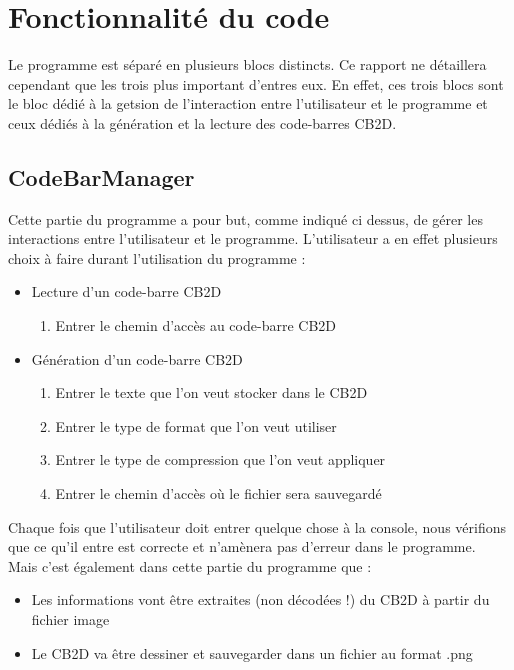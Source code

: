 \newpage

\section{Fonctionnalité du code}

Le programme est séparé en plusieurs blocs distincts. Ce rapport ne détaillera cependant que les trois plus important d'entres eux. En effet, ces trois blocs sont le bloc dédié à la getsion de l'interaction entre l'utilisateur et le programme et ceux dédiés à la génération et la lecture des code-barres CB2D.

\subsection{CodeBarManager}

Cette partie du programme a pour but, comme indiqué ci dessus, de gérer les interactions entre l'utilisateur et le programme. L'utilisateur a en effet plusieurs choix à faire durant l'utilisation du programme : 

\begin{itemize}
\item Lecture d'un code-barre CB2D
	\begin{enumerate}
	\item Entrer le chemin d'accès au code-barre CB2D
	\end{enumerate}
\item Génération d'un code-barre CB2D
	\begin{enumerate}
	\item Entrer le texte que l'on veut stocker dans le CB2D
	\item Entrer le type de format que l'on veut utiliser
	\item Entrer le type de compression que l'on veut appliquer
	\item Entrer le chemin d'accès où le fichier sera sauvegardé
	\end{enumerate}
\end{itemize}

Chaque fois que l'utilisateur doit entrer quelque chose à la console, nous vérifions que ce qu'il entre est correcte et n'amènera pas d'erreur dans le programme. 
\\
Mais c'est également dans cette partie du programme que : 
\begin{itemize}
\item Les informations vont être extraites (non décodées !) du CB2D à partir du fichier image
\item Le CB2D va être dessiner et sauvegarder dans un fichier au format .png
\end{itemize}

